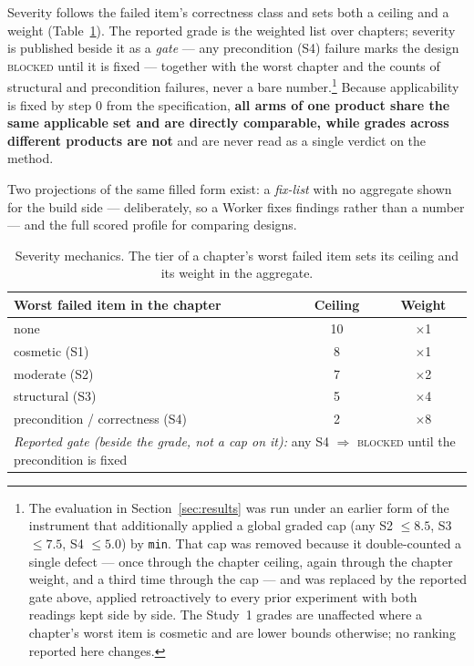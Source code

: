 \documentclass[11pt]{article}
\begin{document}
Severity follows the failed item's correctness class and sets both a ceiling and a weight (Table~\ref{tab:severity}). The reported grade is the weighted list over chapters; severity is published beside it as a \emph{gate} --- any precondition (S4) failure marks the design \textsc{blocked} until it is fixed --- together with the worst chapter and the counts of structural and precondition failures, never a bare number.\footnote{The evaluation in Section~\ref{sec:results} was run under an earlier form of the instrument that additionally applied a global graded cap (any S2 $\leq 8.5$, S3 $\leq 7.5$, S4 $\leq 5.0$) by \texttt{min}. That cap was removed because it double-counted a single defect --- once through the chapter ceiling, again through the chapter weight, and a third time through the cap --- and was replaced by the reported gate above, applied retroactively to every prior experiment with both readings kept side by side. The Study~1 grades are unaffected where a chapter's worst item is cosmetic and are lower bounds otherwise; no ranking reported here changes.} Because applicability is fixed by step 0 from the specification, \textbf{all arms of one product share the same applicable set and are directly comparable, while grades across different products are not} and are never read as a single verdict on the method.

Two projections of the same filled form exist: a \emph{fix-list} with no aggregate shown for the build side --- deliberately, so a Worker fixes findings rather than a number --- and the full scored profile for comparing designs.

\begin{table}[h]
\centering\small
\caption{Severity mechanics. The tier of a chapter's worst failed item sets its ceiling and its weight in the aggregate.}
\label{tab:severity}
\begin{tabular}{lcc}
\toprule
Worst failed item in the chapter & Ceiling & Weight \\
\midrule
none & 10 & $\times$1 \\
cosmetic (S1) & 8 & $\times$1 \\
moderate (S2) & 7 & $\times$2 \\
structural (S3) & 5 & $\times$4 \\
precondition / correctness (S4) & 2 & $\times$8 \\
\midrule
\multicolumn{3}{l}{\emph{Reported gate (beside the grade, not a cap on it):} any S4 $\Rightarrow$ \textsc{blocked} until the precondition is fixed} \\
\bottomrule
\end{tabular}
\end{table}
\end{document}
